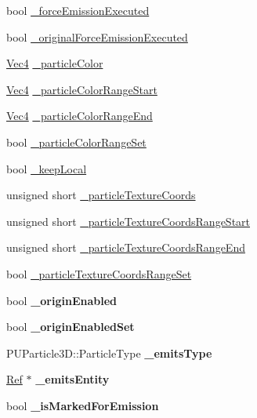 \begin{DoxyCompactItemize}
bool \hyperlink{classPUEmitter_ae1f45f6e268cf9e89456443d31103987}{\+\_\+force\+Emission\+Executed}
\item 
bool \hyperlink{classPUEmitter_a8664fa4bb80d5c15e22f5a6a66fdfe52}{\+\_\+original\+Force\+Emission\+Executed}
\item 
\hyperlink{classVec4}{Vec4} \hyperlink{classPUEmitter_ad78e8ff2b4eb9cb1b199e46eb51e5e55}{\+\_\+particle\+Color}
\item 
\hyperlink{classVec4}{Vec4} \hyperlink{classPUEmitter_a5f8e8341950bf074716ef9095f182e8c}{\+\_\+particle\+Color\+Range\+Start}
\item 
\hyperlink{classVec4}{Vec4} \hyperlink{classPUEmitter_a58a976c99b9b4ff4caafbfaec0701897}{\+\_\+particle\+Color\+Range\+End}
\item 
bool \hyperlink{classPUEmitter_ae38a2bab4e3d09af1b2c000d80030ee7}{\+\_\+particle\+Color\+Range\+Set}
\item 
bool \hyperlink{classPUEmitter_a332fe167b26fab8642a2e5ab9a5e0b9f}{\+\_\+keep\+Local}
\item 
unsigned short \hyperlink{classPUEmitter_a3f485e408d3555deaca841793bc2cbb5}{\+\_\+particle\+Texture\+Coords}
\item 
unsigned short \hyperlink{classPUEmitter_a2f8c970e8a4f6616f5d4714743e71e92}{\+\_\+particle\+Texture\+Coords\+Range\+Start}
\item 
unsigned short \hyperlink{classPUEmitter_a027f5821bdf5361572eeec0718dbc917}{\+\_\+particle\+Texture\+Coords\+Range\+End}
\item 
bool \hyperlink{classPUEmitter_a2117f4a61fea8fe64f94d28a327a0c6d}{\+\_\+particle\+Texture\+Coords\+Range\+Set}
\item 
\mbox{\label{classPUEmitter_ad7365d512de8dbe2e9509ab57b5daf99}} 
bool {\bfseries \+\_\+origin\+Enabled}
\item 
\mbox{\label{classPUEmitter_ae5ffec1b36db5668017cd6fe452c46f6}} 
bool {\bfseries \+\_\+origin\+Enabled\+Set}
\item 
\mbox{\label{classPUEmitter_a0f357a0001bf2884a18fde14dafa2581}} 
P\+U\+Particle3\+D\+::\+Particle\+Type {\bfseries \+\_\+emits\+Type}
\item 
\mbox{\label{classPUEmitter_ac4df5de7d12678a80aa44400c7e4fd2a}} 
\hyperlink{classRef}{Ref} $\ast$ {\bfseries \+\_\+emits\+Entity}
\item 
\mbox{\label{classPUEmitter_ad49932b895afa58629df32d0cb5e6604}} 
bool {\bfseries \+\_\+is\+Marked\+For\+Emission}
\end{DoxyCompactItemize}
